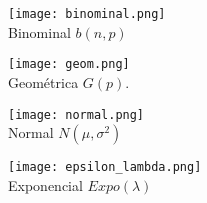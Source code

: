 \begin{figure}[H]\caption[Distribuciones]{Gráficas de las distribuciones de probabiliad mas importantes, en la figura de la izquierda se muestra la función de probabilidad y en la figura de la derecha se muestra  la función de probabilidad acumulativa.}\label{FIG:DISTS}
	\begin{subfigure}[t]{.475\textwidth}\texttt{[image: binominal.png]}\centering\\Binominal $b(n,p)$
	\end{subfigure}\qquad
	\begin{subfigure}[t]{.475\textwidth}\texttt{[image: geom.png]}\centering\\Geométrica $G(p)$.
	\end{subfigure}
\end{figure}



\begin{figure}[H]
	\begin{subfigure}[t]{.475\textwidth}\texttt{[image: normal.png]}\centering\\Normal $N(\mu,\sigma^2)$
	\end{subfigure}\qquad
	\begin{subfigure}[t]{.475\textwidth}\texttt{[image: epsilon\_lambda.png]}\centering\\Exponencial $Expo(\lambda)$
	\end{subfigure}
\end{figure}

